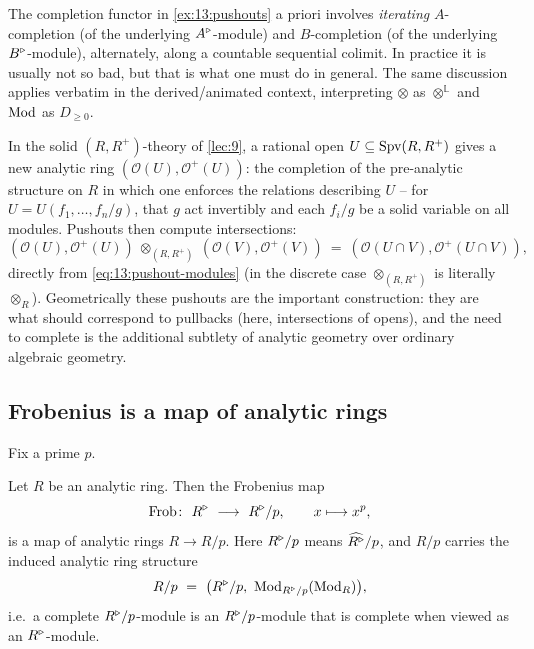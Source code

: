 \begin{remark}
\label{rmk:13:pushout-iteration}
The completion functor in \cref{ex:13:pushouts} a priori involves \emph{iterating}
$A$-completion (of the underlying $A^{\triangleright}$-module) and $B$-completion (of the
underlying $B^{\triangleright}$-module), alternately, along a countable sequential colimit. In
practice it is usually not so bad, but that is what one must do in general. The
same discussion applies verbatim in the derived/animated context, interpreting
$\otimes$ as $\otimes^{\mathbb L}$ and $\operatorname{Mod}$ as $D_{\ge 0}$.
\end{remark}

\begin{example}
\label{ex:13:rational-opens}
In the solid $(R,R^+)$-theory of \cref{lec:9}, a rational open $U\subseteq\operatorname{Spv}(R,R^+)$
gives a new analytic ring $(\mathcal O(U),\mathcal O^+(U))$: the completion of the
pre-analytic structure on $R$ in which one enforces the relations describing $U$
-- for $U=U(f_1,\dots,f_n/g)$, that $g$ act invertibly and each $f_i/g$ be a
solid variable on all modules. Pushouts then compute intersections:
\begin{equation*}
(\mathcal O(U),\mathcal O^+(U))\ \otimes_{(R,R^+)}\ (\mathcal O(V),\mathcal O^+(V))\ =\ (\mathcal O(U\cap V),\mathcal O^+(U\cap V)),
\end{equation*}
directly from \eqref{eq:13:pushout-modules} (in the discrete case
$\otimes_{(R,R^+)}$ is literally $\otimes_R$). Geometrically these pushouts are
the important construction: they are what should correspond to pullbacks (here,
intersections of opens), and the need to complete is the additional subtlety of
analytic geometry over ordinary algebraic geometry.
\end{example}

\subsection{Frobenius is a map of analytic rings}

Fix a prime $p$.

\begin{theorem}[Frobenius]
\label{thm:13:frobenius}
Let $R$ be an analytic ring. Then the Frobenius map
\begin{equation*}
\operatorname{Frob}\colon\ R^{\triangleright}\ \longrightarrow\ R^{\triangleright}/p,\qquad x\longmapsto x^p,
\end{equation*}
is a map of analytic rings $R\to R/p$. Here $R^{\triangleright}/p$ means $\widehat{R^{\triangleright}}/p$,
and $R/p$ carries the induced analytic ring structure
\begin{equation}
\label{eq:13:Rmodp}
R/p\ =\ \big(R^{\triangleright}/p,\ \operatorname{Mod}_{R^{\triangleright}/p}(\operatorname{Mod}_R)\big),
\end{equation}
i.e.\ a complete $R^{\triangleright}/p$-module is an $R^{\triangleright}/p$-module that is complete when
viewed as an $R^{\triangleright}$-module.
\end{theorem}


